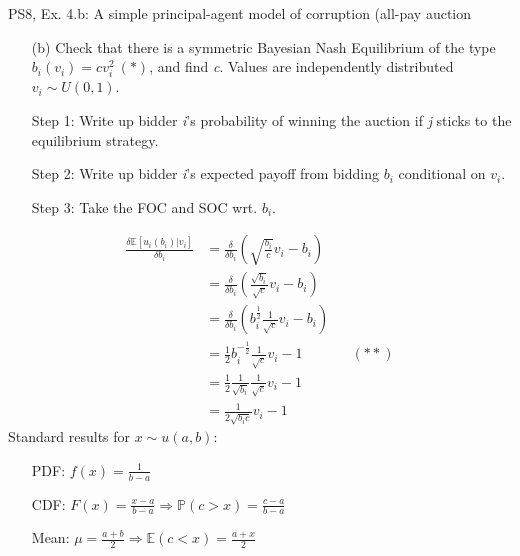 \begin{frame}{PS8, Ex. 4.b: A simple principal-agent model of corruption (all-pay auction}
    \begin{itemize}
      \item[(b)] Check that there is a symmetric Bayesian Nash Equilibrium of the type $b_i(v_i) = cv_i^2\ (*)$, and find \textit{c}. Values are independently distributed $v_i\sim U(0, 1)$.
    \end{itemize} \vspace{-8pt}
    \begin{multicols}{2}
      \begin{itemize}
        \item[Step 1:] Write up bidder \textit{i}'s probability of winning the auction if \textit{j} sticks to the equilibrium strategy.
        \item[Step 2:] Write up bidder \textit{i}'s expected payoff from bidding $b_i$ conditional on $v_i$.
        \item[Step 3:] Take the FOC and SOC wrt. $b_i$.
      \end{itemize} \vspace{-8pt}
      \begin{align*}
        \frac{\delta\mathbb{E}[u_i(b_i)|v_i]}{\delta b_i}
          &=\frac{\delta}{\delta b_i}\left(\sqrt{\frac{b_i}{c}}v_i-b_i\right)\\
          &=\frac{\delta}{\delta b_i}\left(\frac{\sqrt{b_i}}{\sqrt{c}}v_i-b_i\right)\\
          &=\frac{\delta}{\delta b_i}\left(b_i^{\frac{1}{2}}\frac{1}{\sqrt{c}}v_i-b_i\right)\\
          &=\frac{1}{2}b_i^{-\frac{1}{2}}\frac{1}{\sqrt{c}}v_i-1&&(**)\\
          &=\frac{1}{2}\frac{1}{\sqrt{b_i}}\frac{1}{\sqrt{c}}v_i-1\\
          &=\frac{1}{2\sqrt{b_ic}}v_i-1
      \end{align*}
      \vfill\null\columnbreak
      Standard results for $x\sim u(a, b):$ \vspace{-6pt}
      \begin{itemize}
        \item[PDF:] $f(x)=\frac{1}{b-a}$
        \item[CDF:] $F(x)=\frac{x-a}{b-a}\Rightarrow\mathbb{P}(c>x)=\frac{c-a}{b-a}$
        \item[Mean:] $\mu=\frac{a+b}{2}\Rightarrow\mathbb{E}(c<x)=\frac{a+x}{2}$
      \end{itemize}
      \vspace{-6pt}

\end{multicols}
\end{frame}
